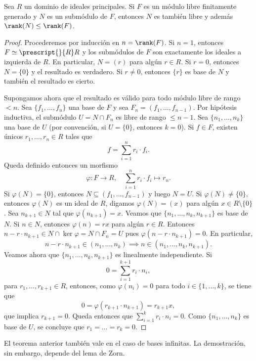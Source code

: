 
\begin{theorem}
\label{thm:rango}
Sea $R$ un dominio de ideales principales. Si $F$ es un módulo libre finitamente generado 
y $N$ es un submódulo de $F$, entonces $N$ es también libre y además 
$\rank(N)\leq\rank(F)$. 
\end{theorem}

\begin{proof}
	Procederemos por inducción en $n=\rank(F)$. Si $n=1$, entonces
	$F\simeq\prescript{}{R}R$ 
	y los submódulos de $F$ son exactamente los ideales a izquierda de $R$. En particular,
	$N=(r)$ para algún $r\in R$. Si $r=0$, entonces $N=\{0\}$ y el resultado es verdadero. Si $r\ne 0$, entonces $\{r\}$ es base de $N$ y también el resultado es cierto. 
	
	Supongamos ahora que el resultado es válido para todo módulo libre de rango $<n$. 
	Sea $\{f_1,\dots,f_n\}$ una
	base de $F$ y sea $F_n=(f_1,\dots,f_{n-1})$. Por hipótesis inductiva, 
	el submódulo $U=N\cap F_n$ es libre de rango $\leq n-1$. Sea
	$\{n_1,\dots,n_k\}$ una base de $U$ (por convención, si $U=\{0\}$, entonces $k=0$). Si $f\in F$, existen únicos $r_1,\dots,r_n\in R$ tales que 
	\[
	f=\sum_{i=1}^n r_i\cdot f_i.
	\]
	Queda definido 
	entonces un morfismo 
	\[
	\varphi\colon F\to R,
	\quad
	\sum_{i=1}^nr_i\cdot f_i\mapsto r_n.
	\] 
	Si $\varphi(N)=\{0\}$, entonces $N\subseteq (f_1,\dots,f_{n-1})$ y luego $N=U$. 
	Si $\varphi(N)\ne\{0\}$, entonces $\varphi(N)$ es un ideal
	de $R$, digamos $\varphi(N)=(x)$ para algún $x\in R\setminus\{0\}$. Sea $n_{k+1}\in N$ 
	tal que $\varphi(n_{k+1})=x$. 
	Veamos que $\{n_1,\dots,n_k,n_{k+1}\}$ es base de $N$. 
	Si $n\in N$, entonces $\varphi(n)=rx$ 
	para algún $r\in R$. Entonces $n-r\cdot n_{k+1}\in N\cap\ker\varphi=N\cap F_n=U$ pues 
	$\varphi(n-r\cdot n_{k+1})=0$. En particular, 
	\[
	n-r\cdot n_{k+1}\in (n_1,\dots,n_k)\implies  
	n\in (n_1,\dots,n_k,n_{k+1}).
	\]
	Veamos ahora que
	$\{n_1,\dots,n_k,n_{k+1}\}$ es linealmente independiente. Si 
	\[
	0=\sum_{i=1}^{k+1}r_i\cdot n_i,
	\]
	para $r_1,\dots,r_{k+1}\in R$, entonces, como $\varphi(n_i)=0$ para todo $i\in\{1,\dots,k\}$, se tiene que 
	\[
	0=\varphi(r_{k+1}\cdot n_{k+1})=r_{k+1}x,
	\]
	que implica $r_{k+1}=0$. Queda entonces que $\sum_{i=1}^kr_i\cdot n_i=0$. Como $\{n_1,\dots,n_k\}$ es base de $U$, se concluye que
	$r_1=\dots=r_k=0$. 
\end{proof}

El teorema anterior también vale en el caso de bases infinitas. La demostración, sin embargo, depende del lema de Zorn.
	
